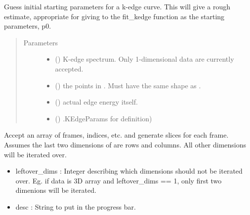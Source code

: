 \documentclass[letterpaper,10pt,english]{sphinxmanual}
\begin{document}
\begin{fulllineitems}
\label{\detokenize{xanespy:xanespy.xanes_math.guess_kedge}}
Guess initial starting parameters for a k-edge curve. This will
give a rough estimate, appropriate for giving to the fit\_kedge
function as the starting parameters, p0.
\begin{quote}\begin{description}
\item[{Parameters}] \leavevmode\begin{itemize}
\item {} 
 (\sphinxstyleliteralemphasis{-}) \textendash{} K-edge spectrum. Only 1-dimensional data are currently accepted.

\item {} 
 (\sphinxstyleliteralemphasis{-}) \textendash{} the points in . Must have the same shape as .

\item {} 
 (\sphinxstyleliteralemphasis{-}) \textendash{} actual edge energy itself.

\item {} 
 (\sphinxstyleliteralemphasis{ (}) \textendash{} .KEdgeParams for definition)

\end{itemize}

\end{description}\end{quote}

\end{fulllineitems}


\begin{fulllineitems}
\label{\detokenize{xanespy:xanespy.xanes_math.iter_indices}}
Accept an array of frames, indices, etc. and generate slices for
each frame. Assumes the last two dimensions of  are rows and
columns. All other dimensions will be iterated over.
\begin{itemize}
\item {} 
leftover\_dims : Integer describing which dimensions should not
be iterated over. Eg. if data is 3D array and leftover\_dims == 1,
only first two dimenions will be iterated.

\item {} 
desc : String to put in the progress bar.

\end{itemize}

\end{fulllineitems}
\end{document}
